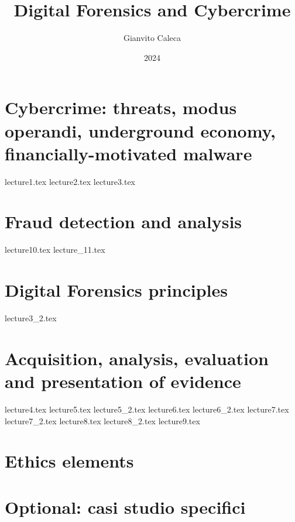 \documentclass{report}
\title{Digital Forensics and Cybercrime}
\date{2024}
\author{Gianvito Caleca}
\begin{document}
\maketitle
\tableofcontents
\part{Cybercrime: threats, modus operandi, underground economy, financially-motivated malware}
{lecture1.tex}
{lecture2.tex}
{lecture3.tex}
\part{Fraud detection and analysis}
{lecture10.tex}
{lecture_11.tex}
\part{Digital Forensics principles}
{lecture3_2.tex}
\part{Acquisition, analysis, evaluation and presentation of evidence}
{lecture4.tex}
{lecture5.tex}
{lecture5_2.tex}
{lecture6.tex}
{lecture6_2.tex}
{lecture7.tex}
{lecture7_2.tex}
{lecture8.tex}
{lecture8_2.tex}
{lecture9.tex}
\part{Ethics elements}
\part{Optional: casi studio specifici}
\end{document}
